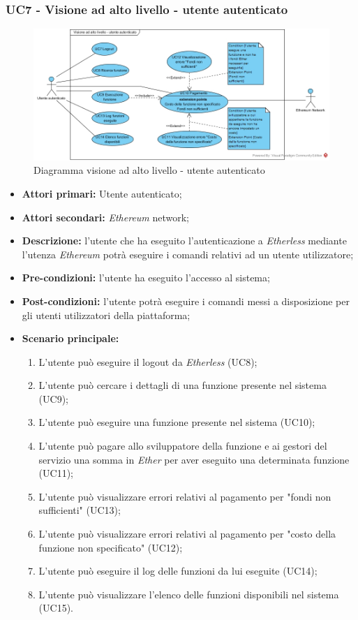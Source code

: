 \subsubsection{UC7 - Visione ad alto livello - utente autenticato}
\begin{figure}[h]
	\centering
	\includegraphics[width=\linewidth]{res/img/utenteAutenticato.jpg}
	\caption{Diagramma visione ad alto livello - utente autenticato}
\end{figure}
\begin{itemize}
	\item \textbf{Attori primari:} Utente autenticato;
	\item \textbf{Attori secondari:} \textit{Ethereum\glo} network;
	\item \textbf{Descrizione:} l'utente che ha eseguito l'autenticazione a \textit{Etherless} mediante l'utenza \textit{Ethereum\glo} potrà eseguire i comandi relativi ad un utente utilizzatore; 
	\item \textbf{Pre-condizioni:} l'utente ha eseguito l'accesso al sistema; 
	\item \textbf{Post-condizioni:} l'utente potrà eseguire i comandi messi a disposizione per gli utenti utilizzatori della piattaforma;
	\item \textbf{Scenario principale:} 
	\begin{enumerate}
		\item L'utente può eseguire il logout da \textit{Etherless} (UC8);
		\item L'utente può cercare i dettagli di una funzione presente nel sistema (UC9);
		\item L'utente può eseguire una funzione presente nel sistema (UC10);
		\item L'utente può pagare allo sviluppatore della funzione e ai gestori del servizio una somma in \textit{Ether\glo} per aver eseguito una determinata funzione (UC11);
		\item L'utente può visualizzare errori relativi al pagamento per "fondi non sufficienti" (UC13);
		\item L'utente può visualizzare errori relativi al pagamento per "costo della funzione non specificato" (UC12);
		\item L'utente può eseguire il log delle funzioni da lui eseguite (UC14);
		\item L'utente può visualizzare l'elenco delle funzioni disponibili nel sistema (UC15).
	\end{enumerate}
\end{itemize}